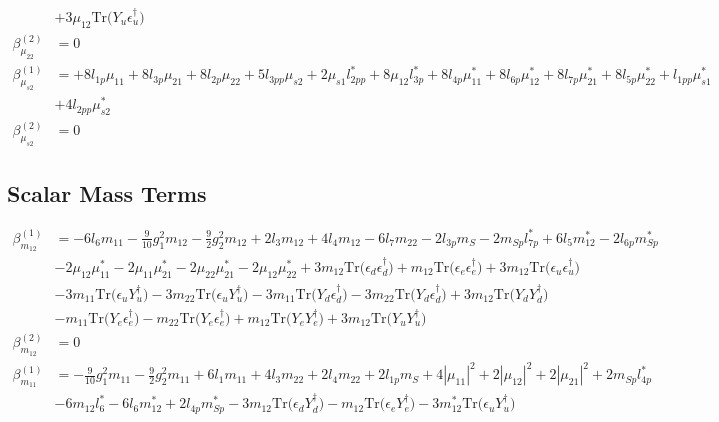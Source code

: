 {\begin{align}
 &+3 \mu_{12} \mbox{Tr}\Big({Y_u  \epsilon_{u}^{\dagger}}\Big) \\ 
\beta_{\mu_{22}}^{(2)} & =  
0\\ 
\beta_{\mu_{s2}}^{(1)} & =  
+8 l_{1p} \mu_{11} +8 l_{3p} \mu_{21} +8 l_{2p} \mu_{22} +5 l_{3pp} \mu_{s2} +2 \mu_{s1} l_{2pp}^* +8 \mu_{12} l_{3p}^* +8 l_{4p} \mu_{11}^* +8 l_{6p} \mu_{12}^* +8 l_{7p} \mu_{21}^* +8 l_{5p} \mu_{22}^* +l_{1pp} \mu_{s1}^* \nonumber \\ 
 &+4 l_{2pp} \mu_{s2}^* \\ 
\beta_{\mu_{s2}}^{(2)} & =  
0
\end{align}} 
\subsection{Scalar Mass Terms}
{\allowdisplaybreaks  \begin{align} 
\beta_{m_{12}}^{(1)} & =  
-6 l_6 m_{11} -\frac{9}{10} g_{1}^{2} m_{12} -\frac{9}{2} g_{2}^{2} m_{12} +2 l_3 m_{12} +4 l_4 m_{12} -6 l_7 m_{22} -2 l_{3p} m_{S} -2 m_{Sp} l_{7p}^* +6 l_5 m_{12}^* -2 l_{6p} m_{Sp}^* \nonumber \\ 
 &-2 \mu_{12} \mu_{11}^* -2 \mu_{11} \mu_{21}^* -2 \mu_{22} \mu_{21}^* -2 \mu_{12} \mu_{22}^* +3 m_{12} \mbox{Tr}\Big({\epsilon_d  \epsilon_{d}^{\dagger}}\Big) +m_{12} \mbox{Tr}\Big({\epsilon_e  \epsilon_{e}^{\dagger}}\Big) +3 m_{12} \mbox{Tr}\Big({\epsilon_u  \epsilon_{u}^{\dagger}}\Big) \nonumber \\ 
 &-3 m_{11} \mbox{Tr}\Big({\epsilon_u  Y_{u}^{\dagger}}\Big) -3 m_{22} \mbox{Tr}\Big({\epsilon_u  Y_{u}^{\dagger}}\Big) -3 m_{11} \mbox{Tr}\Big({Y_d  \epsilon_{d}^{\dagger}}\Big) -3 m_{22} \mbox{Tr}\Big({Y_d  \epsilon_{d}^{\dagger}}\Big) +3 m_{12} \mbox{Tr}\Big({Y_d  Y_{d}^{\dagger}}\Big) \nonumber \\ 
 &- m_{11} \mbox{Tr}\Big({Y_e  \epsilon_{e}^{\dagger}}\Big) - m_{22} \mbox{Tr}\Big({Y_e  \epsilon_{e}^{\dagger}}\Big) +m_{12} \mbox{Tr}\Big({Y_e  Y_{e}^{\dagger}}\Big) +3 m_{12} \mbox{Tr}\Big({Y_u  Y_{u}^{\dagger}}\Big) \\ 
\beta_{m_{12}}^{(2)} & =  
0\\ 
\beta_{m_{11}}^{(1)} & =  
-\frac{9}{10} g_{1}^{2} m_{11} -\frac{9}{2} g_{2}^{2} m_{11} +6 l_1 m_{11} +4 l_3 m_{22} +2 l_4 m_{22} +2 l_{1p} m_{S} +4 |\mu_{11}|^2 +2 |\mu_{12}|^2 +2 |\mu_{21}|^2 +2 m_{Sp} l_{4p}^* \nonumber \\ 
 &-6 m_{12} l_6^* -6 l_6 m_{12}^* +2 l_{4p} m_{Sp}^* -3 m_{12} \mbox{Tr}\Big({\epsilon_d  Y_{d}^{\dagger}}\Big) - m_{12} \mbox{Tr}\Big({\epsilon_e  Y_{e}^{\dagger}}\Big) -3 m_{12}^* \mbox{Tr}\Big({\epsilon_u  Y_{u}^{\dagger}}\Big) \nonumber \\ 

\end{align}}

